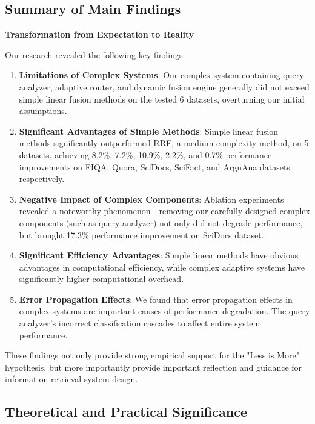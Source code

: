 \documentclass[letterpaper]{article} %
\begin{document}
\subsection{Summary of Main Findings}

\textbf{Transformation from Expectation to Reality}

Our research revealed the following key findings:

\begin{enumerate}
\item \textbf{Limitations of Complex Systems}: Our complex system containing query analyzer, adaptive router, and dynamic fusion engine generally did not exceed simple linear fusion methods on the tested 6 datasets, overturning our initial assumptions.

\item \textbf{Significant Advantages of Simple Methods}: Simple linear fusion methods significantly outperformed RRF, a medium complexity method, on 5 datasets, achieving 8.2\%, 7.2\%, 10.9\%, 2.2\%, and 0.7\% performance improvements on FIQA, Quora, SciDocs, SciFact, and ArguAna datasets respectively.

\item \textbf{Negative Impact of Complex Components}: Ablation experiments revealed a noteworthy phenomenon—removing our carefully designed complex components (such as query analyzer) not only did not degrade performance, but brought 17.3\% performance improvement on SciDocs dataset.

\item \textbf{Significant Efficiency Advantages}: Simple linear methods have obvious advantages in computational efficiency, while complex adaptive systems have significantly higher computational overhead.

\item \textbf{Error Propagation Effects}: We found that error propagation effects in complex systems are important causes of performance degradation. The query analyzer's incorrect classification cascades to affect entire system performance.
\end{enumerate}

These findings not only provide strong empirical support for the "Less is More" hypothesis, but more importantly provide important reflection and guidance for information retrieval system design.

\subsection{Theoretical and Practical Significance}
\end{document}
